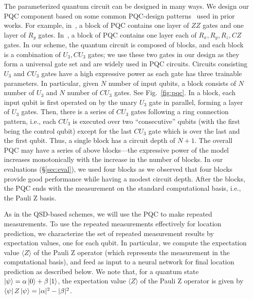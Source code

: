 The parameterized quantum circuit can be designed in many ways. 
We design our PQC component based on some common PQC-design patterns~\cite{liang2023unleashing, ICCAD21-wang} used in prior works.
For example, in~\cite{lloyd2020quantum}, a block of 
PQC contains one layer of $ZZ$ gates 
and one layer of $R_y$ gates.
In~\cite{McClean_2018}, a block of PQC contains one layer each
of $R_x, R_y, R_z, CZ$ gates.
In our scheme, the quantum circuit is composed of blocks, and 
each block is a combination of $U_3, CU_3$ gates;
we use these two gates in our design as they form a universal
gate set and are widely used in PQC circuits.
Circuits consisting $U_3$ and $CU_3$ gates have a high expressive power as each gate has three trainable parameters.
In particular, given $N$ number of input qubits, a block consists of 
$N$ number of $U_3$ and $N$ number of $CU_3$ gates. 
See Fig.~\ref{fig:pqc}.
In a block, each input qubit is first  
operated on by the unary $U_3$ gate in parallel,
forming a layer of $U_3$ gates. 
Then, there is a series of $CU_3$ gates following a ring connection pattern, 
i.e., each $CU_3$ is executed over two ``consecutive'' qubits (with the first being
the control qubit) except for the
last $CU_3$ gate which is over the last and the first qubit. 
Thus, a single block has a circuit depth of $N+1$.
The overall PQC may have a series of above blocks---the expressive power of the model increases monotonically with the increase in the number of blocks.
In our evaluations (\S\ref{sec:eval}), we used four blocks as we observed that four blocks provide good performance while having a modest circuit depth.
After the blocks, the PQC ends with the measurement on the standard computational basis, 
i.e., the Pauli Z basis.

As in the QSD-based schemes, we will use the PQC to make repeated measurements.
To use the repeated measurements effectively for location prediction, we characterize
the set of repeated measurement results by expectation values, one for each qubit.
In particular, we compute the expectation value 
$\langle Z \rangle$ of the Pauli Z operator 
(which represents
the measurement in the computational basis), and feed as input to a neural network for 
final location prediction as described below. 
We note that, for a quantum state $\ket{\psi} = \alpha \ket{0} + \beta \ket{1}$, the expectation value 
$\langle Z \rangle$ of the Pauli Z operator is given by $\bra{\psi} Z \ket{\psi} = |\alpha|^{2} - |\beta|^{2}$.



